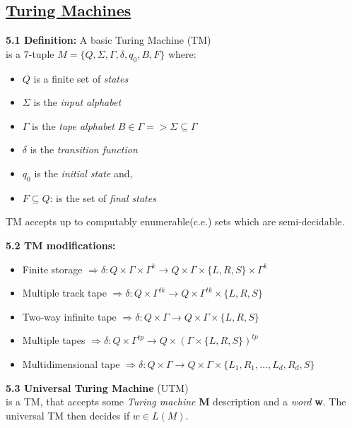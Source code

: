 \documentclass{article}
\begin{document}
\begin{multicols}{2}
	\section{\underline{Turing Machines}}
	\textbf{5.1 Definition:} A basic Turing Machine (TM)\\
	is a 7-tuple $M = \{Q, \Sigma, \Gamma, \delta, q_0, B, F\}$ where:
	\begin{itemize}
		\setlength\itemsep{-0.4em}
		\item $Q$ is a finite set of \textit{states}
		\item $\Sigma$ is the \textit{input alphabet}
		\item $\Gamma$ is the \textit{tape alphabet} \small{$B \in \Gamma => \Sigma \subseteq \Gamma$}
		\item $\delta$ is the \textit{transition function}
		\item $q_0$ is the \textit{initial state} and,
		\item $F \subseteq Q$: is the set of \textit{final states}
	\end{itemize}
	TM accepts up to computably enumerable(c.e.) sets which are semi-decidable.

	\textbf{5.2 TM modifications:}\\
	\begin{itemize}
		\setlength\itemsep{-0.4em}
		\item Finite storage $\Rightarrow \delta: Q \times \Gamma \times \Gamma^k \rightarrow Q \times \Gamma \times \{L, R, S\} \times \Gamma^k$
		\item Multiple track tape $\Rightarrow \delta: Q \times  \Gamma^{tk} \rightarrow Q \times \Gamma^{tk} \times \{L, R, S\}$
		\item Two-way infinite tape $\Rightarrow \delta: Q \times  \Gamma \rightarrow Q \times \Gamma \times \{L, R, S\}$
		\item Multiple tapes $\Rightarrow \delta: Q \times  \Gamma^{tp} \rightarrow Q \times (\Gamma \times \{L, R, S\})^{tp}$
		\item Multidimensional tape $\Rightarrow \delta: Q \times  \Gamma \rightarrow Q \times \Gamma \times \{L_1, R_1, \dots, L_d, R_d, S\}$
	\end{itemize}

	\textbf{5.3 Universal Turing Machine} (UTM)\\
	is a TM, that accepts some \textit{Turing machine} \textbf{M} description and a \textit{word} \textbf{w}.
	The universal TM then decides if $w \in L(M)$.\smallskip


\end{multicols}
\end{document}
